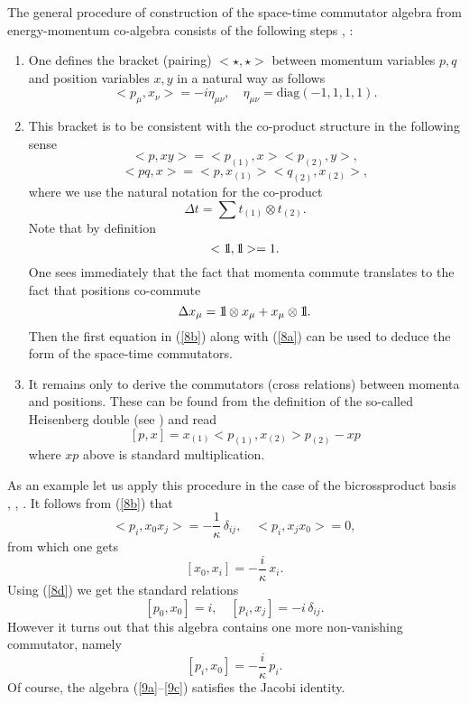 \documentclass [prd,twocolumn,nofootinbib,showpacs]  {revtex4}
\def\bbbone{{\mathchoice {\rm 1\mskip-4mu l} {\rm 1\mskip-4mu l}
{\rm 1\mskip-4.5mu l} {\rm 1\mskip-5mu l}}}
\begin{document}
The  general procedure of construction of the space-time
commutator algebra from energy-momentum  co-algebra
consists of the following steps \cite{maru}, \cite{crossalg}:

\begin{enumerate}
\item One defines the bracket (pairing) $<\star, \star>$ between momentum variables
$p,q$ and position variables $x,y$ in
a natural way as follows
\begin{equation}\label{8a}
 <p_\mu, x_\nu> =  -i \eta_{\mu\nu}, \quad \eta_{\mu\nu} = \mbox{diag}(-1,1,1,1).
\end{equation}
\item This bracket is to be consistent with the co-product structure in the following sense
$$
 <p, xy> = <p_{(1)}, x><p_{(2)}, y>,
$$
 \begin{equation}\label{8b}
 <pq,x> =<p, x_{(1)}><q_{(2)}, x_{(2)}>,
\end{equation}
where we use the natural notation for the co-product $$\Delta t = \sum
t_{(1)} \otimes t_{(2)}.$$ Note that by
definition $$<\bbbone, \bbbone> =1.$$ One sees immediately that
the fact that momenta commute translates to the fact that
positions co-commute
\begin{equation}\label{8c}
  \Delta x_\mu = \bbbone \otimes x_\mu + x_\mu \otimes \bbbone.
\end{equation}
Then the first equation in (\ref{8b}) along with (\ref{8a}) can be used to deduce the form of the space-time commutators.
\item  It remains only to derive the commutators (cross relations) between momenta and positions. These can be found
from the definition of the so-called Heisenberg double (see \cite{crossalg}) and read
\begin{equation}\label{8d}
 [p,x] =  x_{(1)}<p_{(1)}, x_{(2)}>p_{(2)}-xp
\end{equation}
where $xp$ above is standard multiplication.
\end{enumerate}

As an example let us apply this procedure in the case of the
bicrossproduct basis \cite{maru}, \cite{crossalg}, \cite{luno}. It
follows from (\ref{8b}) that
$$
<p_i, x_0 x_j> = -\frac1\kappa\, \delta_{ij}, \quad <p_i,  x_jx_0>=0,
$$
from which one gets
\begin{equation}\label{9a}
[x_0, x_i] = -\frac{i}\kappa\, x_i.
\end{equation}
Using  (\ref{8d}) we get the standard relations
\begin{equation}\label{9b}
[p_0, x_0] = i, \quad [p_i, x_j] = -i \, \delta_{ij}.
\end{equation}
However it turns out that this algebra contains one more
non-vanishing commutator, namely
\begin{equation}\label{9c}
 [p_i, x_0] = -\frac{i}\kappa\, p_i.
\end{equation}
Of course, the algebra (\ref{9a}--\ref{9c}) satisfies the Jacobi identity.
\newline
\end{document}
